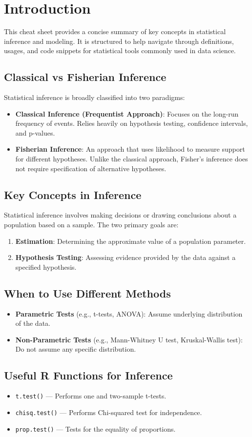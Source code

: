 \section{Introduction}

This cheat sheet provides a concise summary of key concepts in statistical inference and modeling. It is structured to help navigate through definitions, usages, and code snippets for statistical tools commonly used in data science.

\subsection{Classical vs Fisherian Inference}
Statistical inference is broadly classified into two paradigms:
\begin{itemize}
    \item \textbf{Classical Inference (Frequentist Approach)}: Focuses on the long-run frequency of events. Relies heavily on hypothesis testing, confidence intervals, and p-values.
    \item \textbf{Fisherian Inference}: An approach that uses likelihood to measure support for different hypotheses. Unlike the classical approach, Fisher’s inference does not require specification of alternative hypotheses.
\end{itemize}

\subsection{Key Concepts in Inference}
Statistical inference involves making decisions or drawing conclusions about a population based on a sample. The two primary goals are:
\begin{enumerate}
    \item \textbf{Estimation}: Determining the approximate value of a population parameter.
    \item \textbf{Hypothesis Testing}: Assessing evidence provided by the data against a specified hypothesis.
\end{enumerate}

\subsection{When to Use Different Methods}
\begin{itemize}
    \item \textbf{Parametric Tests} (e.g., t-tests, ANOVA): Assume underlying distribution of the data.
    \item \textbf{Non-Parametric Tests} (e.g., Mann-Whitney U test, Kruskal-Wallis test): Do not assume any specific distribution.
\end{itemize}

\subsection{Useful R Functions for Inference}
\begin{itemize}
    \item \texttt{t.test()} --- Performs one and two-sample t-tests.
    \item \texttt{chisq.test()} --- Performs Chi-squared test for independence.
    \item \texttt{prop.test()} --- Tests for the equality of proportions.
\end{itemize}
